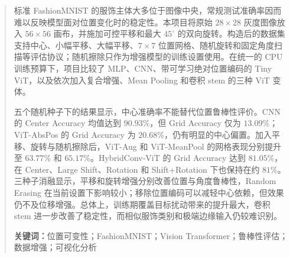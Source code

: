\begin{abstract}
  标准 FashionMNIST 的服饰主体大多位于图像中央，常规测试准确率因而难以反映模型面对位置变化时的稳定性。本项目将原始 $28\times28$ 灰度图像放入 $56\times56$ 画布，并施加可控平移和最大 $45^\circ$ 的双向旋转。构造后的数据集支持中心、小幅平移、大幅平移、$7\times7$ 位置网格、随机旋转和固定角度扫描等评估协议；随机擦除只作为增强模型的训练设置使用。在统一的 CPU 训练预算下，项目比较了 MLP、CNN、带可学习绝对位置编码的 Tiny ViT，以及依次加入复合增强、Mean Pooling 和卷积 stem 的三种 ViT 变体。

  五个随机种子下的结果显示，中心准确率不能替代位置鲁棒性评价。CNN 的 Center Accuracy 均值达到 $90.93\%$，但 Grid Accuracy 仅为 $13.09\%$；ViT-AbsPos 的 Grid Accuracy 为 $20.68\%$，仍有明显的中心偏置。加入平移、旋转与随机擦除后，ViT-Aug 和 ViT-MeanPool 的网格表现分别提升至 $63.77\%$ 和 $65.17\%$。HybridConv-ViT 的 Grid Accuracy 达到 $81.05\%$，在 Center、Large Shift、Rotation 和 Shift+Rotation 下也保持在约 $81\%$。三种子消融显示，平移和旋转增强分别改善位置与角度鲁棒性，Random Erasing 在当前设置下影响较小；移除位置编码可以减轻中心依赖，但效果仍不及位移增强。总体上，训练期覆盖目标扰动带来的提升最大，卷积 stem 进一步改善了稳定性，而相似服饰类别和极端边缘输入仍较难识别。\par\vspace{0.5em}

  \noindent\textbf{关键词：}位置可变性；FashionMNIST；Vision Transformer；鲁棒性评估；数据增强；可视化分析
\end{abstract}

